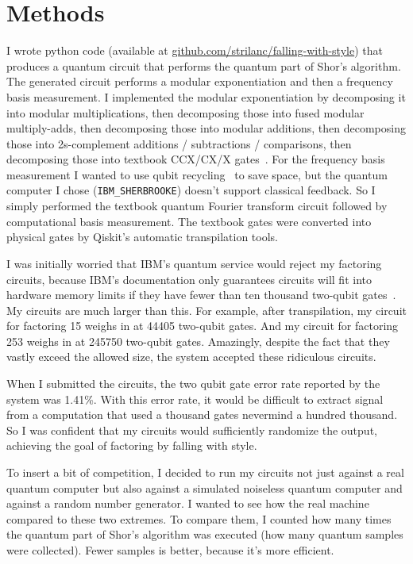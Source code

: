 \documentclass{article}
\begin{document}
\section{Methods}

I wrote python code (available at \href{https://github.com/strilanc/falling-with-style}{github.com/strilanc/falling-with-style}) that produces a quantum circuit that performs the quantum part of Shor's algorithm.
The generated circuit performs a modular exponentiation and then a frequency basis measurement.
I implemented the modular exponentiation by decomposing it into modular multiplications, then decomposing those into fused modular multiply-adds, then decomposing those into modular additions, then decomposing those into 2s-complement additions / subtractions / comparisons, then decomposing those into textbook CCX/CX/X gates~\cite{cuccaro2004}.
For the frequency basis measurement I wanted to use qubit recycling~\cite{Mosca1999} to save space, but the quantum computer I chose (\texttt{IBM\_SHERBROOKE}) doesn't support classical feedback.
So I simply performed the textbook quantum Fourier transform circuit followed by computational basis measurement.
The textbook gates were converted into physical gates by Qiskit's automatic transpilation tools.

I was initially worried that IBM's quantum service would reject my factoring circuits, because IBM's documentation only guarantees circuits will fit into hardware memory limits if they have fewer than ten thousand two-qubit gates~\cite{joblimits}.
My circuits are much larger than this.
For example, after transpilation, my circuit for factoring 15 weighs in at 44405 two-qubit gates.
And my circuit for factoring 253 weighs in at 245750 two-qubit gates.
Amazingly, despite the fact that they vastly exceed the allowed size, the system accepted these ridiculous circuits.

When I submitted the circuits, the two qubit gate error rate reported by the system was 1.41\%.
With this error rate, it would be difficult to extract signal from a computation that used a thousand gates nevermind a hundred thousand.
So I was confident that my circuits would sufficiently randomize the output, achieving the goal of factoring by falling with style.

To insert a bit of competition, I decided to run my circuits not just against a real quantum computer but also against a simulated noiseless quantum computer and against a random number generator.
I wanted to see how the real machine compared to these two extremes.
To compare them, I counted how many times the quantum part of Shor's algorithm was executed (how many quantum samples were collected).
Fewer samples is better, because it's more efficient.
\end{document}
